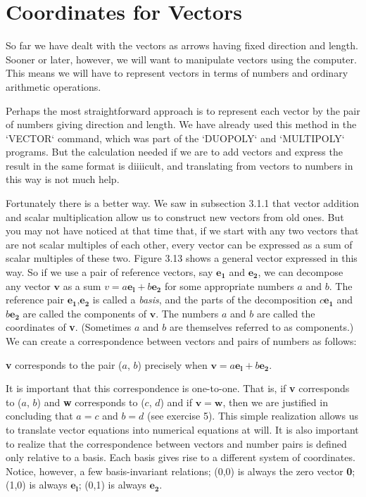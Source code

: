 \documentclass{book}
\begin{document}
\section{Coordinates for Vectors}

So far we have dealt with the vectors as arrows having fixed direction
and length. Sooner or later, however, we will want to manipulate vectors
using the computer. This means we will have to represent vectors in
terms of numbers and ordinary arithmetic operations.

Perhaps the most straightforward approach is to represent each vector
by the pair of numbers giving direction and length. We have already used
this method in the \textsc{`VECTOR`} command, which was part of the \textsc{`DUOPOLY`} and
\textsc{`MULTIPOLY`} programs. But the calculation needed if we are to add vectors
and express the result in the same format is diiiicult, and translating
from vectors to numbers in this way is not much help. 

Fortunately there is a better way. We saw in subsection 3.1.1 that
vector addition and scalar multiplication allow us to construct new
vectors from old ones. But you may not have noticed at that time that, if
we start with any two vectors that are not scalar multiples of each other,
every vector can be expressed as a sum of scalar multiples of these two.
Figure 3.13 shows a general vector expressed in this way. So if we use
a pair of reference vectors, say $\mathbf{e_1}$ and $\mathbf{e_2}$, we can decompose any vector
$\mathbf{v}$ as a sum $v = a\mathbf{e_l} + b\mathbf{e_2}$ for some appropriate numbers $a$ and $b$. The
reference pair $\mathbf{e_1}$,$\mathbf{e_2}$ is called a {\em basis}, and the parts of the decomposition
$c\mathbf{e_1}$ and $b\mathbf{e_2}$ are called the components of $\mathbf{v}$. The numbers $a$ and $b$ are
called the coordinates of \textbf{v}. (Sometimes $a$ and $b$ are themselves referred
to as components.) We can create a correspondence between vectors and
pairs of numbers as follows:

\textbf{v} corresponds to the pair ($a$, $b$) precisely when $\mathbf{v} = a\mathbf{e_l} + b\mathbf{e_2}$.

It is important that this correspondence is one-to-one. That is, if \textbf{v}
corresponds to ($a$, $b$) and \textbf{w} corresponds to ($c$, $d$) and if $\mathbf{v} = \mathbf{w}$, then
we are justified in concluding that $a = c$ and $b = d$ (see exercise
5). This simple realization allows us to translate vector equations into
numerical equations at will. It is also important to realize that the
correspondence between vectors and number pairs is defined only relative
to a basis. Each basis gives rise to a different system of coordinates.
Notice, however, a few basis-invariant relations; (0,0) is always the zero
vector \textbf{0}; (1,0) is always $\mathbf{e_l}$; (0,1) is always $\mathbf{e_2}$.
\end{document}
